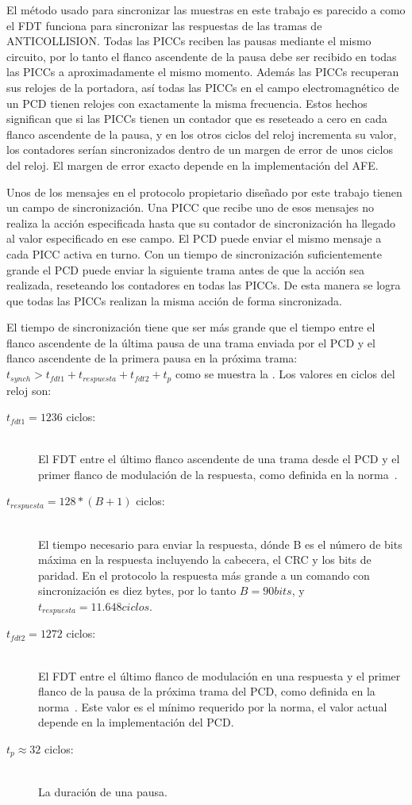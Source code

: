 \documentclass[a4paper, twoside, 11pt]{report}
\begin{document}
El método usado para sincronizar las muestras en este trabajo es parecido a como el FDT funciona para sincronizar las respuestas de las tramas de ANTICOLLISION. Todas las PICCs reciben las pausas mediante el mismo circuito, por lo tanto el flanco ascendente de la pausa debe ser recibido en todas las PICCs a aproximadamente el mismo momento. Además las PICCs recuperan sus relojes de la portadora, así todas las PICCs en el campo electromagnético de un PCD tienen relojes con exactamente la misma frecuencia. Estos hechos significan que si las PICCs tienen un contador que es reseteado a cero en cada flanco ascendente de la pausa, y en los otros ciclos del reloj incrementa su valor, los contadores serían sincronizados dentro de un margen de error de unos ciclos del reloj. El margen de error exacto depende en la implementación del AFE. 

Unos de los mensajes en el protocolo propietario diseñado por este trabajo tienen un campo de sincronización. Una PICC que recibe uno de esos mensajes no realiza la acción especificada hasta que su contador de sincronización ha llegado al valor especificado en ese campo. El PCD puede enviar el mismo mensaje a cada PICC activa en turno. Con un tiempo de sincronización suficientemente grande el PCD puede enviar la siguiente trama antes de que la acción sea realizada, reseteando los contadores en todas las PICCs. De esta manera se logra que todas las PICCs realizan la misma acción de forma sincronizada.

El tiempo de sincronización tiene que ser más grande que el tiempo entre el flanco ascendente de la última pausa de una trama enviada por el PCD y el flanco ascendente de la primera pausa en la próxima trama: $t_{synch} > t_{fdt1} + t_{respuesta} + t_{fdt2} + t_p$ como se muestra la . Los valores en ciclos del reloj son:

\begin{description}
  \item[$t_{fdt1} = 1236$ ciclos:] \hfill \\ El FDT entre el último flanco ascendente de una trama desde el PCD y el primer flanco de modulación de la respuesta, como definida en la norma~\cite{iso14443-3}.
  \item[$t_{respuesta} = 128 * \left(B + 1\right)$ ciclos:] \hfill \\ El tiempo necesario para enviar la respuesta, dónde B es el número de bits máxima en la respuesta incluyendo la cabecera, el CRC y los bits de paridad. En el protocolo la respuesta más grande a un comando con sincronización es diez bytes, por lo tanto $B = 90 bits$, y $t_{respuesta} = 11.648 ciclos$.
  \item[$t_{fdt2} = 1272$ ciclos:] \hfill \\ El FDT entre el último flanco de modulación en una respuesta y el primer flanco de la pausa de la próxima trama del PCD, como definida en la norma~\cite{iso14443-3}. Este valor es el mínimo requerido por la norma, el valor actual depende en la implementación del PCD.
  \item[$t_p \approx 32$ ciclos:] \hfill \\ La duración de una pausa.
\end{description}
\end{document}
